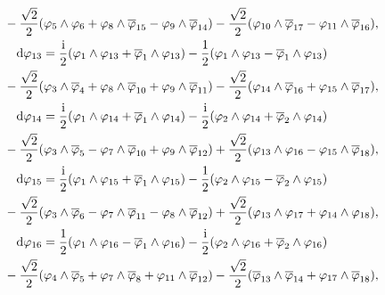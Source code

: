 \documentclass[pdftex]{sigma}
\numberwithin{equation}{section}
\begin{document}
\begin{Example}
\begin{gather*}
\hphantom{{\rm d} \varphi_{18} =}{} - \frac{\sqrt{2}}{2} (\varphi_5 \wedge \varphi_6 + \varphi_8 \wedge \overline \varphi_{15} - \varphi_9 \wedge \overline \varphi_{14} ) - \frac{\sqrt{2}}{2} (\varphi_{10} \wedge \overline \varphi_{17} - \varphi_{11} \wedge \overline \varphi_{16}),\\
{\rm d} \varphi_{13} = \frac{{\rm i}}{2} (\varphi_1\wedge \varphi_{13} + \overline \varphi_1 \wedge \varphi_{13}) - \frac{1}{2} (\varphi_1 \wedge \varphi_{13} - \overline \varphi_1 \wedge \varphi_{13})\\
\hphantom{{\rm d} \varphi_{18} =}{} - \frac{\sqrt{2}}{2} (\varphi_3 \wedge \overline \varphi_4 + \varphi_8 \wedge \overline \varphi_{10} + \varphi_9 \wedge \overline \varphi_{11} ) - \frac{\sqrt{2}}{2} (\varphi_{14} \wedge \overline \varphi_{16} + \varphi_{15} \wedge \overline \varphi_{17}),
\\
{\rm d} \varphi_{14} = \frac{{\rm i}}{2} (\varphi_1 \wedge \varphi_{14} + \overline \varphi_1 \wedge \varphi_{14})- \frac{{\rm i}}{2} (\varphi_2 \wedge \varphi_{14} +\overline \varphi_2 \wedge \varphi_{14}) \\
\hphantom{{\rm d} \varphi_{18} =}{} - \frac{\sqrt{2}}{2} (\varphi_3 \wedge \overline \varphi_5 - \varphi_7 \wedge \overline \varphi_{10} + \varphi_9 \wedge \overline \varphi_{12} ) +\frac{\sqrt{2}}{2} (\varphi_{13} \wedge \varphi_{16} - \varphi_{15} \wedge \overline \varphi_{18}),\\
{\rm d} \varphi_{15} = \frac{{\rm i}}{2} (\varphi_1 \wedge \varphi_{15} + \overline \varphi_1 \wedge \varphi_{15}) - \frac{1}{2} (\varphi_2 \wedge \varphi_{15} - \overline \varphi_2 \wedge \varphi_{15})\\
\hphantom{{\rm d} \varphi_{18} =}{} - \frac{\sqrt{2}}{2} (\varphi_3 \wedge \overline \varphi_6 - \varphi_7 \wedge \overline \varphi_{11} - \varphi_8 \wedge \overline \varphi_{12} ) + \frac{\sqrt{2}}{2} (\varphi_{13} \wedge \varphi_{17} + \varphi_{14} \wedge \varphi_{18}),\\
{\rm d} \varphi_{16} = \frac{1}{2} (\varphi_1 \wedge \varphi_{16} - \overline \varphi_1 \wedge \varphi_{16}) - \frac{{\rm i}}{2} (\varphi_2 \wedge \varphi_{16} + \overline \varphi_2 \wedge \varphi_{16})\\
\hphantom{{\rm d} \varphi_{18} =}{} - \frac{\sqrt{2}}{2} (\varphi_4 \wedge \overline \varphi_5 + \varphi_7 \wedge \overline \varphi_{8} + \varphi_{11} \wedge \overline \varphi_{12} ) - \frac{\sqrt{2}}{2} ( \overline \varphi_{13} \wedge \overline \varphi_{14} + \varphi_{17} \wedge \overline \varphi_{18}),\\

\end{gather*}
\end{Example}
\end{document}
